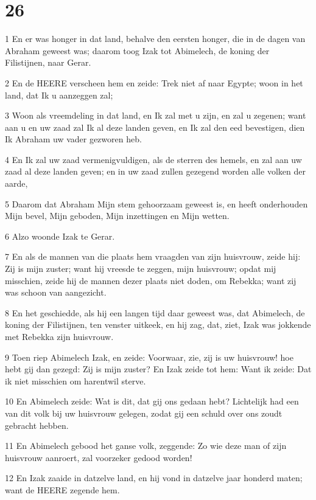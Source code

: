 \chapter{26}

\par 1 En er was honger in dat land, behalve den eersten honger, die in de dagen van Abraham geweest was; daarom toog Izak tot Abimelech, de koning der Filistijnen, naar Gerar.
\par 2 En de HEERE verscheen hem en zeide: Trek niet af naar Egypte; woon in het land, dat Ik u aanzeggen zal;
\par 3 Woon als vreemdeling in dat land, en Ik zal met u zijn, en zal u zegenen; want aan u en uw zaad zal Ik al deze landen geven, en Ik zal den eed bevestigen, dien Ik Abraham uw vader gezworen heb.
\par 4 En Ik zal uw zaad vermenigvuldigen, als de sterren des hemels, en zal aan uw zaad al deze landen geven; en in uw zaad zullen gezegend worden alle volken der aarde,
\par 5 Daarom dat Abraham Mijn stem gehoorzaam geweest is, en heeft onderhouden Mijn bevel, Mijn geboden, Mijn inzettingen en Mijn wetten.
\par 6 Alzo woonde Izak te Gerar.
\par 7 En als de mannen van die plaats hem vraagden van zijn huisvrouw, zeide hij: Zij is mijn zuster; want hij vreesde te zeggen, mijn huisvrouw; opdat mij misschien, zeide hij de mannen dezer plaats niet doden, om Rebekka; want zij was schoon van aangezicht.
\par 8 En het geschiedde, als hij een langen tijd daar geweest was, dat Abimelech, de koning der Filistijnen, ten venster uitkeek, en hij zag, dat, ziet, Izak was jokkende met Rebekka zijn huisvrouw.
\par 9 Toen riep Abimelech Izak, en zeide: Voorwaar, zie, zij is uw huisvrouw! hoe hebt gij dan gezegd: Zij is mijn zuster? En Izak zeide tot hem: Want ik zeide: Dat ik niet misschien om harentwil sterve.
\par 10 En Abimelech zeide: Wat is dit, dat gij ons gedaan hebt? Lichtelijk had een van dit volk bij uw huisvrouw gelegen, zodat gij een schuld over ons zoudt gebracht hebben.
\par 11 En Abimelech gebood het ganse volk, zeggende: Zo wie deze man of zijn huisvrouw aanroert, zal voorzeker gedood worden!
\par 12 En Izak zaaide in datzelve land, en hij vond in datzelve jaar honderd maten; want de HEERE zegende hem.
